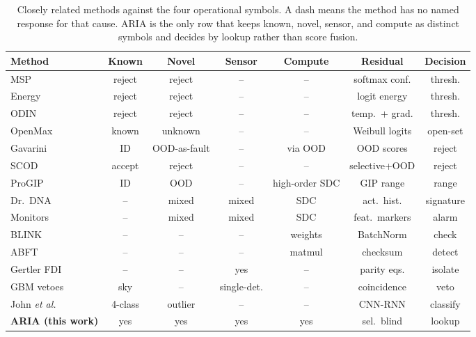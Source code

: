 \documentclass[journal]{IEEEtran}
\begin{document}
\begin{table}[!t]
\caption{Closely related methods against the four operational symbols. A dash means the method has no named response for that cause. ARIA is the only row that keeps known, novel, sensor, and compute as distinct symbols and decides by lookup rather than score fusion.}
\label{tab:cmp}
\centering
\footnotesize
\setlength{\tabcolsep}{3.2pt}
\begin{tabular}{lcccccc}
\toprule
Method & Known & Novel & Sensor & Compute & Residual & Decision \\
\midrule
MSP~\cite{hendrycks2017} & reject & reject & -- & -- & softmax conf. & thresh. \\
Energy~\cite{liu2020} & reject & reject & -- & -- & logit energy & thresh. \\
ODIN~\cite{liang2018} & reject & reject & -- & -- & temp.\ + grad. & thresh. \\
OpenMax~\cite{bendale2016} & known & unknown & -- & -- & Weibull logits & open-set \\
Gavarini~\cite{gavarini2022} & ID & OOD-as-fault & -- & via OOD & OOD scores & reject \\
SCOD~\cite{sirc2022,narasimhan2024} & accept & reject & -- & -- & selective+OOD & reject \\
ProGIP~\cite{progip2025} & ID & OOD & -- & high-order SDC & GIP range & range \\
Dr.~DNA~\cite{drdna2024} & -- & mixed & mixed & SDC & act.\ hist. & signature \\
Monitors~\cite{schorn2020,geissler2023} & -- & mixed & mixed & SDC & feat.\ markers & alarm \\
BLINK~\cite{blink2026} & -- & -- & -- & weights & BatchNorm & check \\
ABFT~\cite{ftcnn2020,hastings2021} & -- & -- & -- & matmul & checksum & detect \\
Gertler FDI~\cite{gertler1990,isermann2006} & -- & -- & yes & -- & parity eqs. & isolate \\
GBM vetoes~\cite{goldstein2019,veske2025} & sky & -- & single-det. & -- & coincidence & veto \\
John \textit{et al.}~\cite{john2025} & 4-class & outlier & -- & -- & CNN-RNN & classify \\
\textbf{ARIA (this work)} & yes & yes & yes & yes & sel.\ blind & lookup \\
\bottomrule
\end{tabular}
\end{table}
\end{document}
